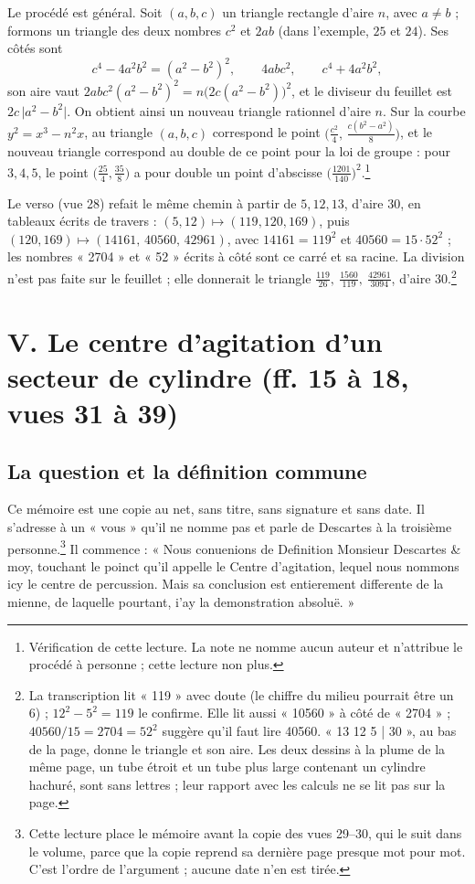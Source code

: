 \documentclass[11pt,a4paper]{article}
\begin{document}
Le procédé est général. Soit \((a,b,c)\) un triangle rectangle d'aire \(n\),
avec \(a\neq b\) ; formons un triangle des deux nombres \(c^2\) et \(2ab\) (dans
l'exemple, \(25\) et \(24\)). Ses côtés sont
\[
c^4-4a^2b^2=(a^2-b^2)^2,\qquad 4abc^2,\qquad c^4+4a^2b^2,
\]
son aire vaut \(2abc^2(a^2-b^2)^2=n\bigl(2c(a^2-b^2)\bigr)^2\), et le diviseur du
feuillet est \(2c\,\lvert a^2-b^2\rvert\). On obtient ainsi un nouveau triangle
rationnel d'aire \(n\). Sur la courbe \(y^2=x^3-n^2x\), au triangle
\((a,b,c)\) correspond le point \(\bigl(\tfrac{c^2}{4},\,
\tfrac{c(b^2-a^2)}{8}\bigr)\), et le nouveau triangle correspond au double de ce
point pour la loi de groupe : pour \(3,4,5\), le point
\(\bigl(\tfrac{25}{4},\tfrac{35}{8}\bigr)\) a pour double un point d'abscisse
\(\bigl(\tfrac{1201}{140}\bigr)^2\).\footnote{Vérification de cette lecture. La
note ne nomme aucun auteur et n'attribue le procédé à personne ; cette lecture
non plus.}

Le verso (vue 28) refait le même chemin à partir de \(5,12,13\), d'aire \(30\),
en tableaux écrits de travers : \((5,12)\mapsto(119,120,169)\), puis
\((120,169)\mapsto(14161,\,40560,\,42961)\), avec \(14161=119^2\) et
\(40560=15\cdot 52^2\) ; les nombres « 2704 » et « 52 » écrits à côté sont ce
carré et sa racine. La division n'est pas faite sur le feuillet ; elle donnerait
le triangle \(\tfrac{119}{26},\ \tfrac{1560}{119},\ \tfrac{42961}{3094}\), d'aire
\(30\).\footnote{La transcription lit « 119 » avec doute (le chiffre du milieu
pourrait être un 6) ; \(12^2-5^2=119\) le confirme. Elle lit aussi « 10560 » à
côté de « 2704 » ; \(40560/15=2704=52^2\) suggère qu'il faut lire 40560.
« 13 12 5 | 30 », au bas de la page, donne le triangle et son aire. Les deux
dessins à la plume de la même page, un tube étroit et un tube plus large
contenant un cylindre hachuré, sont sans lettres ; leur rapport avec les
calculs ne se lit pas sur la page.}

\section*{V. Le centre d'agitation d'un secteur de cylindre (ff. 15 à 18, vues 31 à 39)}

\subsection*{La question et la définition commune}

Ce mémoire est une copie au net, sans titre, sans signature et sans date. Il
s'adresse à un « vous » qu'il ne nomme pas et parle de Descartes à la
troisième personne.\footnote{Cette lecture place le mémoire avant la copie des
vues 29–30, qui le suit dans le volume, parce que la copie reprend sa dernière
page presque mot pour mot. C'est l'ordre de l'argument ; aucune date n'en est
tirée.} Il commence : « Nous conuenions de Definition Monsieur Descartes \& moy,
touchant le poinct qu'il appelle le Centre d'agitation, lequel nous nommons icy
le centre de percussion. Mais sa conclusion est entierement differente de la
mienne, de laquelle pourtant, i'ay la demonstration absoluë. »
\end{document}
